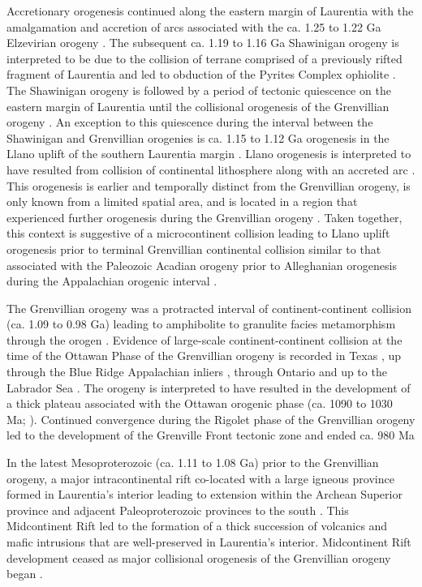 \documentclass[11pt,letterpaper]{article}
\begin{document}
Accretionary orogenesis continued along the eastern margin of Laurentia with the amalgamation and accretion of arcs associated with the ca. 1.25 to 1.22 Ga Elzevirian orogeny \citep{McLelland2013a}. The subsequent ca. 1.19 to 1.16 Ga Shawinigan orogeny is interpreted to be due to the collision of terrane comprised of a previously rifted fragment of Laurentia and led to obduction of the Pyrites Complex ophiolite \citep{McLelland2010a, Chiarenzelli2011a}. The Shawinigan orogeny is followed by a period of tectonic quiescence on the eastern margin of Laurentia until the collisional orogenesis of the Grenvillian orogeny \citep{McLelland2010a}. An exception to this quiescence during the interval between the Shawinigan and Grenvillian orogenies is ca. 1.15 to 1.12 Ga orogenesis in the Llano uplift of the southern Laurentia margin \citep{Mosher1998a}. Llano orogenesis is interpreted to have resulted from collision of continental lithosphere along with an accreted arc \citep{Mosher1998a}. This orogenesis is earlier and temporally distinct from the Grenvillian orogeny, is only known from a limited spatial area, and is located in a region that experienced further orogenesis during the Grenvillian orogeny \citep{Grimes2004a}. Taken together, this context is suggestive of a microcontinent collision leading to Llano uplift orogenesis prior to terminal Grenvillian continental collision similar to that associated with the Paleozoic Acadian orogeny prior to Alleghanian orogenesis during the Appalachian orogenic interval \citep{fig:tectonic_history}. 

The Grenvillian orogeny was a protracted interval of continent-continent collision (ca. 1.09 to 0.98 Ga) leading to amphibolite to granulite facies metamorphism through the orogen \citep{McLelland2010a}. Evidence of large-scale continent-continent collision at the time of the Ottawan Phase of the Grenvillian orogeny is recorded in Texas \citep{Grimes2004a}, up through the Blue Ridge Appalachian inliers \citep{Johnson2020a}, through Ontario and up to the Labrador Sea \citep{Rivers2008a}. The orogeny is interpreted to have resulted in the development of a thick plateau associated with the Ottawan orogenic phase (ca. 1090 to 1030 Ma; \citealp{Rivers2008a}). Continued convergence during the Rigolet phase of the Grenvillian orogeny led to the development of the Grenville Front tectonic zone and ended ca. 980 Ma \citep{Hynes2010a}

In the latest Mesoproterozoic (ca. 1.11 to 1.08 Ga) prior to the Grenvillian orogeny, a major intracontinental rift co-located with a large igneous province formed in Laurentia's interior leading to extension within the Archean Superior province and adjacent Paleoproterozoic provinces to the south \citep{Cannon1992b}. This Midcontinent Rift led to the formation of a thick succession of volcanics and mafic intrusions that are well-preserved in Laurentia's interior. Midcontinent Rift development ceased as major collisional orogenesis of the Grenvillian orogeny began \citep{Swanson-Hysell2019a}. 
\end{document}
